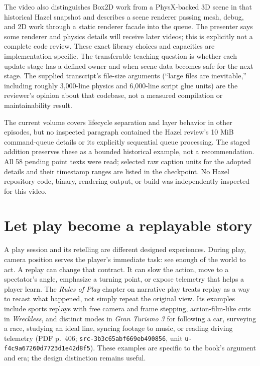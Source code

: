 The video also distinguishes Box2D work from a PhysX-backed 3D scene in that historical Hazel snapshot and describes a scene renderer passing mesh, debug, and 2D work through a static renderer facade into the queue. The presenter says some renderer and physics details will receive later videos; this is explicitly not a complete code review. These exact library choices and capacities are implementation-specific. The transferable teaching question is whether each update stage has a defined owner and when scene data becomes safe for the next stage. The supplied transcript's file-size arguments (``large files are inevitable,'' including roughly 3,000-line physics and 6,000-line script glue units) are the reviewer's opinion about that codebase, not a measured compilation or maintainability result.

The current volume covers lifecycle separation and layer behavior in other episodes, but no inspected paragraph contained the Hazel review's 10 MiB command-queue details or its explicitly sequential queue processing. The staged addition preserves these as a bounded historical example, not a recommendation. All 58 pending point texts were read; selected raw caption units for the adopted details and their timestamp ranges are listed in the checkpoint. No Hazel repository code, binary, rendering output, or build was independently inspected for this video.

\section{Let play become a replayable story}\label{06-engine-ii-ch046-let-play-become-a-replayable-story}

A play session and its retelling are different designed experiences. During play, camera position serves the player's immediate task: see enough of the world to act. A replay can change that contract. It can slow the action, move to a spectator's angle, emphasize a turning point, or expose telemetry that helps a player learn. The \emph{Rules of Play} chapter on narrative play treats replay as a way to recast what happened, not simply repeat the original view. Its examples include sports replays with free camera and frame stepping, action-film-like cuts in \emph{Wreckless}, and distinct modes in \emph{Gran Turismo 3} for following a car, surveying a race, studying an ideal line, syncing footage to music, or reading driving telemetry (PDF p.~406; \texttt{src-3b3c65abf669eb490856}, unit \texttt{u-f4c9a67260d7723d1e42d8f5}). These examples are specific to the book's argument and era; the design distinction remains useful.

